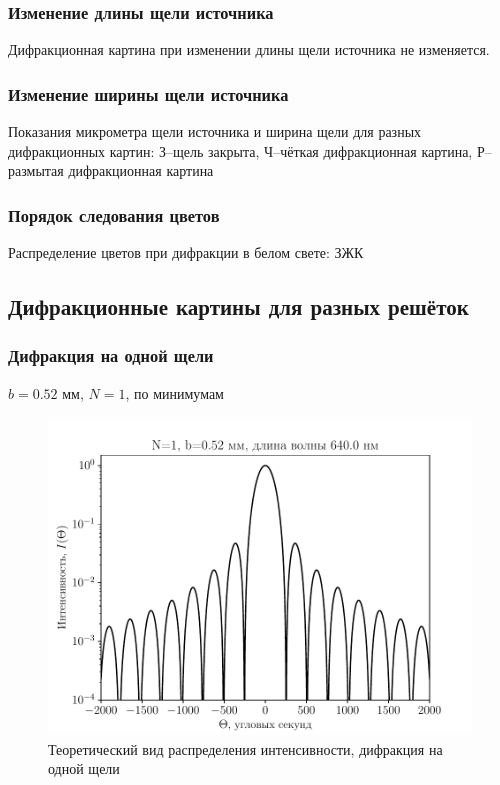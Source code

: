 \subsubsection{Изменение длины щели источника}
Дифракционная картина при изменении длины щели источника не изменяется. 

\subsubsection{Изменение ширины щели источника}

\begin{table}[H]
	    \caption{Показания микрометра щели источника и ширина щели для разных дифракционных картин: З--щель закрыта, Ч--чёткая дифракционная картина, Р--размытая дифракционная картина}
	    \label{tab:chem1}

	\mytable
	
\end{table}

\subsubsection{Порядок следования цветов}
Распределение цветов при дифракции в белом свете: ЗЖК


\subsection{Дифракционные картины для разных решёток}
\subsubsection{Дифракция на одной щели}
\begin{table}[H]
	    \caption{$b=0.52$ мм, $N=1$, по минимумам}
	    \label{tab:chem1}

	\mytable
	
\end{table}
\begin{figure}[H]
	\centering
	\includegraphics[]{plot/N1}
	\caption{Теоретический вид распределения интенсивности, дифракция на одной щели}
	\label{fig:figure1}
\end{figure}
